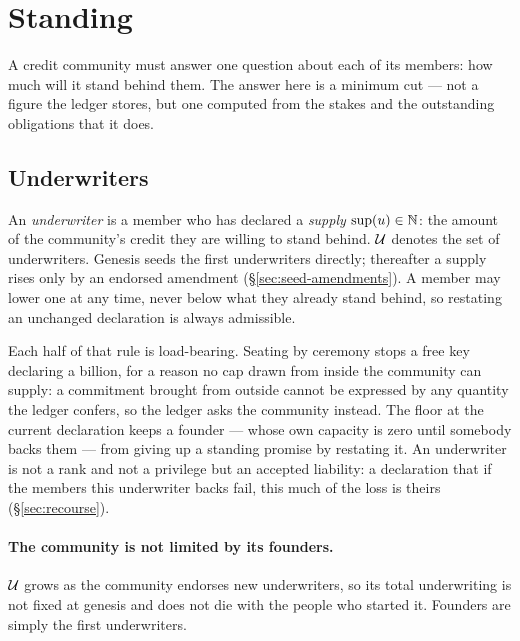 \section{Standing}
\label{sec:standing}

A credit community must answer one question about each of its members: how much will it
stand behind them. The answer here is a minimum cut --- not a figure the ledger stores,
but one computed from the stakes and the outstanding obligations that it does.

\subsection{Underwriters}

\begin{definition}[Underwriter]
\label{def:underwriter}
An \emph{underwriter} is a member who has declared a \emph{supply}
$\mathrm{sup}(u) \in \mathbb{N}$: the amount of the community's credit they are willing to
stand behind. $\mathcal{U}$ denotes the set of underwriters. Genesis seeds the first underwriters
directly; thereafter a supply rises only by an endorsed amendment
(\S\ref{sec:seed-amendments}). A member may lower one at any time, never below what they
already stand behind, so restating an unchanged declaration is always admissible.
\end{definition}

Each half of that rule is load-bearing. Seating by ceremony stops a free key declaring a
billion, for a reason no cap drawn from inside the community can supply: a commitment
brought from outside cannot be expressed by any quantity the ledger confers, so the ledger
asks the community instead. The floor at the current declaration keeps a founder ---
whose own capacity is zero until somebody backs them --- from giving up a standing promise
by restating it. An underwriter is not a rank and not a privilege but an accepted
liability: a declaration that if the members this underwriter backs fail, this much of the
loss is theirs (\S\ref{sec:recourse}).

\paragraph{The community is not limited by its founders.} $\mathcal{U}$ grows as the community
endorses new underwriters, so its total underwriting is not fixed at genesis and does not
die with the people who started it. Founders are simply the first underwriters.

